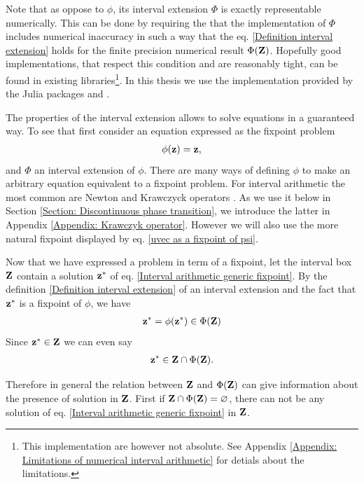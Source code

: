 \documentclass[
11pt, %
english, %
singlespacing, %
nolistspacing, %
liststotoc, %
headsepline, %
]{MastersDoctoralThesis} %
\begin{document}
Note that as oppose to $\phi$, its interval extension $\Phi$ is exactly representable numerically. This can be done by requiring the that the implementation of $\Phi$ includes numerical inaccuracy in such a way that the eq. \eqref{Definition interval extension} holds for the finite precision numerical result $\Phi(\boldsymbol{\mathrm{Z}})$. Hopefully good implementations, that respect this condition and are reasonably tight, can be found in existing libraries\footnote{This implementation are however not absolute. See Appendix \ref{Appendix: Limitations of numerical interval arithmetic} for detials about the limitations.}. In this thesis we use the implementation provided by the Julia packages  \cite{intervalarithmetic} and  \cite{intervalrootfinding}.

The properties of the interval extension allows to solve equations in a guaranteed way. To see that first consider an equation expressed as the fixpoint problem
\begin{align}
	\phi(\boldsymbol{\mathrm{z}}) = \boldsymbol{\mathrm{z}},  \label{Interval arithmetic generic fixpoint}
\end{align}
and $\Phi$ an interval extension of $\phi$. There are many ways of defining $\phi$ to make an arbitrary equation equivalent to a fixpoint problem. For interval arithmetic the most common are Newton and Krawczyck  operators \cite{moore2009introduction, tucker2011validated}. As we use it below in Section \ref{Section: Discontinuous phase transition}, we introduce the latter in Appendix \ref{Appendix: Krawczyk operator}. However we will also use the more natural fixpoint displayed by eq. \eqref{uvec as a fixpoint of psi}.

Now that we have expressed a problem in term of a fixpoint, let the interval box $\boldsymbol{\mathrm{Z}}$ contain a solution $\boldsymbol{\mathrm{z}}^*$ of eq. \eqref{Interval arithmetic generic fixpoint}. By the definition \ref{Definition interval extension} of an interval extension and the fact that $\boldsymbol{\mathrm{z}}^*$ is a fixpoint of $\phi$, we have
\begin{align}
	\boldsymbol{\mathrm{z}}^* = \phi(\boldsymbol{\mathrm{z}}^*) \in \Phi(\boldsymbol{\mathrm{Z}})
\end{align}
Since $\boldsymbol{\mathrm{z}}^* \in \boldsymbol{\mathrm{Z}}$ we can even say
\begin{align}
	\boldsymbol{\mathrm{z}}^* \in \boldsymbol{\mathrm{Z}} \cap \Phi(\boldsymbol{\mathrm{Z}}).  \label{Generic solution refinement}
\end{align}

Therefore in general the relation between $\boldsymbol{\mathrm{Z}}$ and $\Phi(\boldsymbol{\mathrm{Z}})$ can give information about the presence of solution in $\boldsymbol{\mathrm{Z}}$. First if $\boldsymbol{\mathrm{Z}} \cap \Phi(\boldsymbol{\mathrm{Z}}) = \varnothing$, there can not be any solution of eq. \eqref{Interval arithmetic generic fixpoint} in $\boldsymbol{\mathrm{Z}}$.
\end{document}
